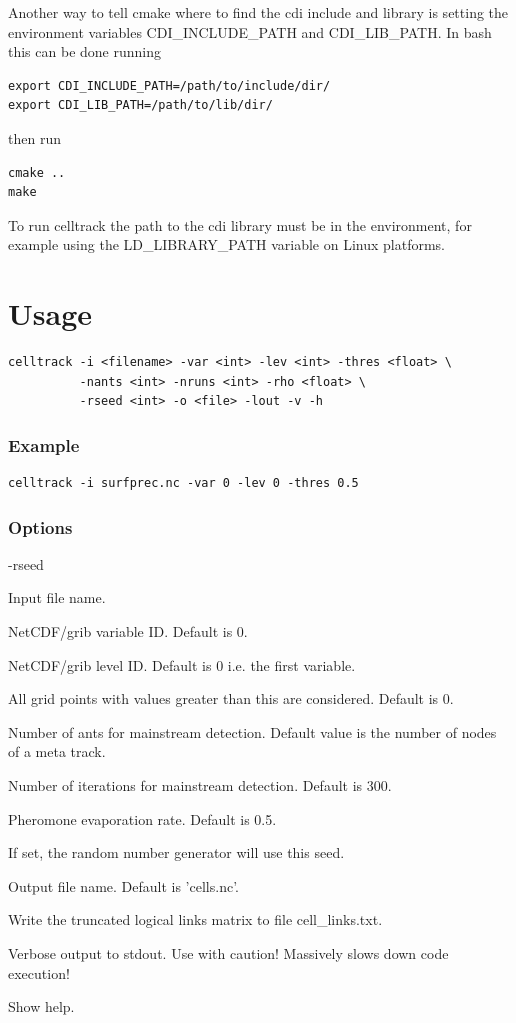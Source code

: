 \documentclass{scrartcl}
\begin{document}
Another way to tell cmake where to find the cdi include and library is setting the environment variables CDI\_INCLUDE\_PATH and CDI\_LIB\_PATH. In bash this can be done running
\begin{verbatim}
export CDI_INCLUDE_PATH=/path/to/include/dir/
export CDI_LIB_PATH=/path/to/lib/dir/
\end{verbatim}
then run
\begin{verbatim}
cmake ..
make
\end{verbatim}
To run celltrack the path to the cdi library must be in the environment, for example using the LD\_LIBRARY\_PATH variable on Linux platforms.

\section{Usage}
\begin{verbatim}
celltrack -i <filename> -var <int> -lev <int> -thres <float> \
          -nants <int> -nruns <int> -rho <float> \
          -rseed <int> -o <file> -lout -v -h
\end{verbatim}

\subsubsection*{Example}
\begin{verbatim}
celltrack -i surfprec.nc -var 0 -lev 0 -thres 0.5
\end{verbatim}

\subsubsection*{Options}
\begin{labeling}{-rseed }
	\item[-i] Input file name.
	\item[-var] NetCDF/grib variable ID. Default is 0.
	\item[-lev] NetCDF/grib level ID. Default is 0 i.e. the first variable.
	\item[-thres] All grid points with values greater than this are considered. Default is 0.
	\item[-nants] Number of ants for mainstream detection. Default value is the number of nodes of a meta track.
	\item[-nruns] Number of iterations for mainstream detection. Default is 300.
	\item[-rho] Pheromone evaporation rate. Default is 0.5.
	\item[-rseed] If set, the random number generator will use this seed.
	\item[-o] Output file name. Default is 'cells.nc'.
    \item[-lout] Write the truncated logical links matrix to file cell\_links.txt.
	\item[-v] Verbose output to stdout. Use with caution! Massively slows down code execution!
	\item[-h] Show help.
\end{labeling}
\end{document}
